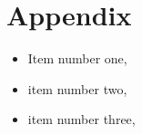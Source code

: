 \chapter*{Appendix}

\lipsum[1]

\begin{itemize}
	\item Item number one, 
	\item item number two, 
	\item item number three, 
\end{itemize}

\lipsum[3]
\vspace{7pt}
\begin{table}[!h]
	\centering
	\caption{List of conferences at which I presented the results of investigations in the form of an oral presentation. }
	\label{conferences} 
	\vspace{-5pt}
\end{table}








